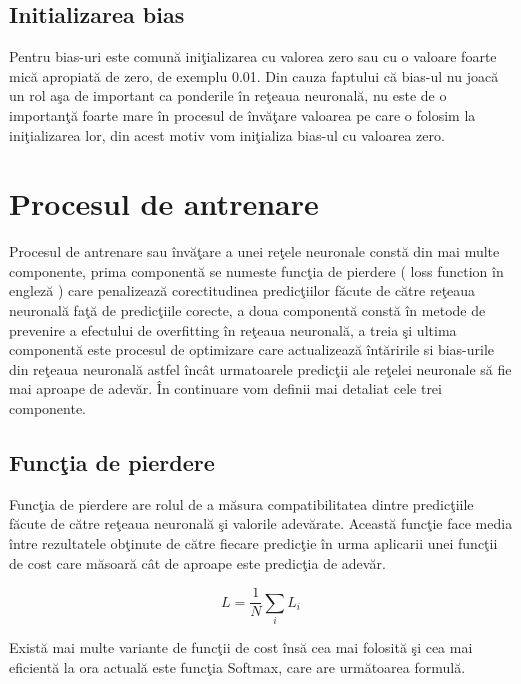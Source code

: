 \subsection{Initializarea bias}

Pentru bias-uri este comun\u{a} ini\c{t}ializarea cu valorea zero sau cu o valoare foarte mic\u{a} apropiat\u{a} de zero, de exemplu 0.01. Din cauza faptului c\u{a} bias-ul nu joac\u{a} un rol a\c{s}a de important ca ponderile \^{i}n re\c{t}eaua neuronal\u{a}, nu este de o importan\c{t}\u{a} foarte mare \^{i}n procesul de \^{i}nv\u{a}\c{t}are valoarea pe care o folosim la ini\c{t}ializarea lor, din acest motiv vom ini\c{t}ializa bias-ul cu valoarea zero.

\section{Procesul de antrenare}

Procesul de antrenare sau \^{i}nv\u{a}\c{t}are a unei re\c{t}ele neuronale const\u{a} din mai multe componente, prima component\u{a} se numeste func\c{t}ia de pierdere ( loss function \^{i}n englez\u{a} ) care penalizeaz\u{a} corectitudinea predic\c{t}iilor f\u{a}cute de c\u{a}tre re\c{t}eaua neuronal\u{a} fa\c{t}\u{a} de predic\c{t}iile corecte, a doua component\u{a} const\u{a} \^{i}n metode de prevenire a efectului de overfitting \^{i}n re\c{t}eaua neuronal\u{a}, a treia \c{s}i ultima component\u{a} este procesul de optimizare care actualizeaz\u{a} \^{i}nt\u{a}ririle si bias-urile din re\c{t}eaua neuronal\u{a} astfel \^{i}nc\^{a}t urmatoarele predic\c{t}ii ale re\c{t}elei neuronale s\u{a} fie mai aproape de adev\u{a}r. \^{I}n continuare vom definii mai detaliat cele trei componente.

\subsection{Func\c{t}ia de pierdere}

Func\c{t}ia de pierdere are rolul de a m\u{a}sura compatibilitatea dintre predic\c{t}iile f\u{a}cute de c\u{a}tre re\c{t}eaua neuronal\u{a} \c{s}i valorile adev\u{a}rate. Aceast\u{a} func\c{t}ie face media \^{i}ntre rezultatele ob\c{t}inute de c\u{a}tre fiecare predic\c{t}ie \^{i}n urma aplicarii unei func\c{t}ii de cost care m\u{a}soar\u{a} c\^{a}t de aproape este predic\c{t}ia de adev\u{a}r.

$$L = \frac{1}{N} \sum_i L_i $$

Exist\u{a} mai multe variante de func\c{t}ii de cost \^{i}ns\u{a} cea mai folosit\u{a} \c{s}i cea mai eficient\u{a} la ora actual\u{a} este func\c{t}ia Softmax, care are urm\u{a}toarea formul\u{a}.

